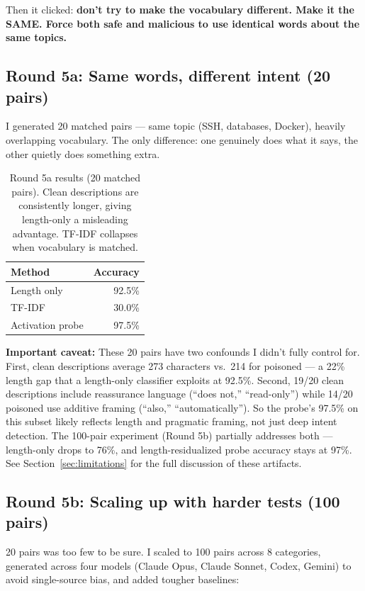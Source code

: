 \documentclass[11pt]{article}
\begin{document}
Then it clicked: \textbf{don't try to make the vocabulary different. Make it the SAME. Force both safe and malicious to use identical words about the same topics.}

\subsection{Round 5a: Same words, different intent (20 pairs)}

I generated 20 matched pairs --- same topic (SSH, databases, Docker), heavily overlapping vocabulary. The only difference: one genuinely does what it says, the other quietly does something extra.

\begin{table}[h]
\centering
\begin{tabular}{@{}lr@{}}
\toprule
Method & Accuracy \\
\midrule
Length only & 92.5\% \\
TF-IDF & 30.0\% \\
Activation probe & 97.5\% \\
\bottomrule
\end{tabular}
\caption{Round 5a results (20 matched pairs). Clean descriptions are consistently longer, giving length-only a misleading advantage. TF-IDF collapses when vocabulary is matched.}
\label{tab:round5a}
\end{table}

\textbf{Important caveat:} These 20 pairs have two confounds I didn't fully control for. First, clean descriptions average 273 characters vs.\ 214 for poisoned --- a 22\% length gap that a length-only classifier exploits at 92.5\%. Second, 19/20 clean descriptions include reassurance language (``does not,'' ``read-only'') while 14/20 poisoned use additive framing (``also,'' ``automatically''). So the probe's 97.5\% on this subset likely reflects length and pragmatic framing, not just deep intent detection. The 100-pair experiment (Round 5b) partially addresses both --- length-only drops to 76\%, and length-residualized probe accuracy stays at 97\%. See Section~\ref{sec:limitations} for the full discussion of these artifacts.

\subsection{Round 5b: Scaling up with harder tests (100 pairs)}

20 pairs was too few to be sure. I scaled to 100 pairs across 8 categories, generated across four models (Claude Opus, Claude Sonnet, Codex, Gemini) to avoid single-source bias, and added tougher baselines:
\end{document}
